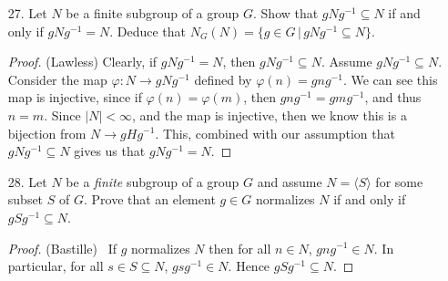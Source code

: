 \documentclass[10pt]{article}
\theoremstyle{plain}
\renewcommand{\phi}{\varphi}
\newcommand\inv{^{-1}}
\begin{document}
\begin{itemize}
\item[27.]Let $N$ be a finite subgroup of a group $G$.  Show that $gNg\inv \subseteq N$ if and only if $gNg\inv = N$. Deduce that $N_G(N) = \{g\in G\, |\, gNg\inv \subseteq N\}$.

\begin{proof} (Lawless)
Clearly, if $gNg\inv = N$, then $gNg\inv \subseteq N$. Assume $gNg\inv \subseteq N$. Consider the map $\phi: N \to gNg\inv$ defined by $\phi(n) = gng\inv$. We can see this map is injective, since if $\phi(n) = \phi(m)$, then $gng\inv = gmg\inv$, and thus $n = m$. Since $|N| < \infty$, and the map is injective, then we know this is a bijection from $N \to gHg\inv$. This, combined with our assumption that $gNg\inv \subseteq N$ gives us that $gNg\inv = N$. 

\end{proof}

\item[28.] Let $N$ be a \textit{finite} subgroup of a group $G$ and assume $N=\langle S \rangle$ for some subset $S$ of $G$. Prove that an element $g \in G$ normalizes $N$ if and only if $gSg^{-1}\subseteq N$.

\begin{proof}(Bastille) \ If $g$ normalizes $N$ then for all $n \in N$, $gng^{-1} \in N$. In particular, for all $s \in S \subseteq N$, $gsg^{-1} \in N$. Hence $gSg^{-1} \subseteq N$. 


\end{proof}
\end{itemize}
\end{document}
